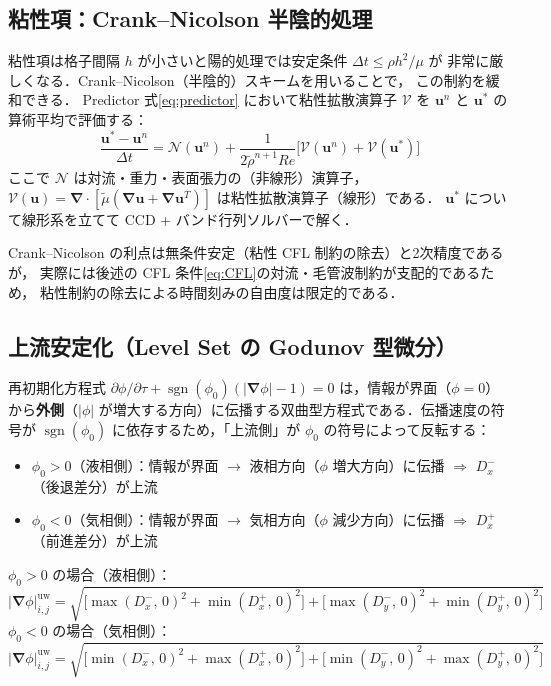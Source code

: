 \documentclass[12pt, a4paper, titlepage]{article}
\newcommand{\jp}[1]{{\normalfont\jpfont #1}}
\newcommand{\bu}{\bm{u}}
\newcommand{\bnabla}{\bm{\nabla}}
\begin{document}
\subsection{\jp{粘性項：Crank--Nicolson 半陰的処理}}
\label{sec:CN}

\jp{粘性項は格子間隔 $h$ が小さいと陽的処理では安定条件 $\Delta t \leq \rho h^2/\mu$ が
非常に厳しくなる．Crank--Nicolson（半陰的）スキームを用いることで，
この制約を緩和できる．
Predictor 式\eqref{eq:predictor} において粘性拡散演算子 $\mathcal{V}$ を
$\bu^n$ と $\bu^*$ の算術平均で評価する：}
\begin{equation}
  \frac{\bu^* - \bu^n}{\Delta t}
  = \mathcal{N}(\bu^n)
  + \frac{1}{2\tilde\rho^{n+1} Re}\bigl[\mathcal{V}(\bu^n) + \mathcal{V}(\bu^*)\bigr]
  \label{eq:CN}
\end{equation}
\jp{ここで $\mathcal{N}$ は対流・重力・表面張力の（非線形）演算子，
$\mathcal{V}(\bu) = \bnabla\cdot[\tilde\mu(\bnabla\bu+\bnabla\bu^T)]$ は粘性拡散演算子（線形）である．
$\bu^*$ について線形系を立てて CCD + バンド行列ソルバーで解く．}

\jp{Crank--Nicolson の利点は無条件安定（粘性 CFL 制約の除去）と2次精度であるが，
実際には後述の CFL 条件\eqref{eq:CFL}の対流・毛管波制約が支配的であるため，
粘性制約の除去による時間刻みの自由度は限定的である．}

\subsection{\jp{上流安定化（Level Set の Godunov 型微分）}}
\label{sec:upstream}

\jp{再初期化方程式 $\partial\phi/\partial\tau + \operatorname{sgn}(\phi_0)(|\bnabla\phi|-1)=0$ は，情報が界面（$\phi=0$）から\textbf{外側}（$|\phi|$ が増大する方向）に伝播する双曲型方程式である．伝播速度の符号が $\operatorname{sgn}(\phi_0)$ に依存するため，「上流側」が $\phi_0$ の符号によって反転する：}
\begin{itemize}
  \item \jp{$\phi_0 > 0$（液相側）：情報が界面 $\to$ 液相方向（$\phi$ 増大方向）に伝播 $\Rightarrow$ $D^-_x$（後退差分）が上流}
  \item \jp{$\phi_0 < 0$（気相側）：情報が界面 $\to$ 気相方向（$\phi$ 減少方向）に伝播 $\Rightarrow$ $D^+_x$（前進差分）が上流}
\end{itemize}

\begin{tcolorbox}[mybox, title={Godunov \jp{型上流勾配（$\phi_0$ 符号依存，2次元）}}]
\jp{$\phi_0 > 0$ の場合（液相側）：}
\begin{equation}
  |\bnabla\phi|^{\mathrm{uw}}_{i,j} =
  \sqrt{
    \bigl[\max(D^-_x,\,0)^2 + \min(D^+_x,\,0)^2\bigr]
    +
    \bigl[\max(D^-_y,\,0)^2 + \min(D^+_y,\,0)^2\bigr]
  }
  \label{eq:godunov_pos}
\end{equation}
\jp{$\phi_0 < 0$ の場合（気相側）：}
\begin{equation}
  |\bnabla\phi|^{\mathrm{uw}}_{i,j} =
  \sqrt{
    \bigl[\min(D^-_x,\,0)^2 + \max(D^+_x,\,0)^2\bigr]
    +
    \bigl[\min(D^-_y,\,0)^2 + \max(D^+_y,\,0)^2\bigr]
  }
  \label{eq:godunov_neg}
\end{equation}
\end{tcolorbox}
\end{document}
